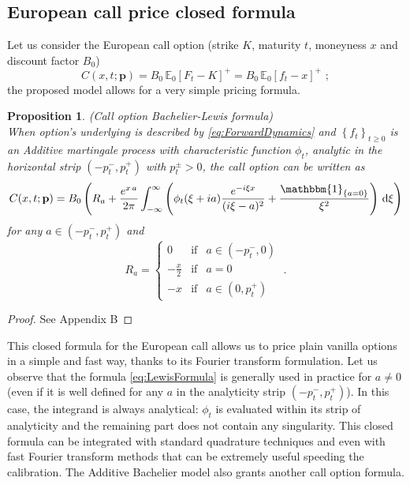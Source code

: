 \documentclass[12pt]{article}
\newtheorem{proposition}[theorem]{Proposition}
\theoremstyle{definition}
\theoremstyle{remark}
\numberwithin{theorem}{section}
\numberwithin{proposition}{section}
\numberwithin{lemma}{section}
\numberwithin{corollary}{section}
\numberwithin{definition}{section}
\numberwithin{remark}{section}
\numberwithin{example}{section}
\newcommand{\E}{\mathbb{E}}
\newcommand{\be}{\begin{equation}}
\newcommand{\en}{\end{equation}}
\begin{document}
\subsection{European call price closed formula}

Let us consider the European call option (strike $K$, maturity $t$, moneyness $x$ and discount factor $B_0$)
\begin{equation}
\label{eq:EU_generic}
C(x, t; \mathbf{p}) =B_0\,\E_0[F_t-K]^+=B_0\,\E_0[f_t-x]^+\,\,;
\end{equation}
the proposed model allows for a very simple pricing formula.
\begin{proposition} {\rm (Call option Bachelier-Lewis formula)} 
\label{prop:Lewis}\\ 
When option's underlying is described by \eqref{eq:ForwardDynamics} and $ \left\{f_t \right\}_{t\geq 0}$ is an Additive martingale process with 
characteristic function $\phi_t$, analytic in the horizontal strip $(-p_t^-,p_t^+)$ with $p_t^\pm>0$, the call option can be written as
\be
\label{eq:LewisFormula}
C(x, t; \mathbf{p}) =B_0\left(R_a+\frac{e^{x\,a}}{2\pi}\int_{-\infty}^{\infty}\left(\phi_t(\xi+ia)\frac{e^{-i\xi x}}{(i\xi-a)^2}+\frac{\mathbbm{1}_{\{a=0\}}}{\xi^2}\right)\,\mathrm{d}\xi\right)
\en
for any $a\in(-p_t^-,p_t^+)$ and
\[
R_a=
\left\{
\begin{array}{cll}
    0							&\text{if} & a\in(-p_t^-,0)\\[3mm]
    \displaystyle -\frac{x}{2} 	&\text{if} & a=0\\[3mm]
    -x 						&\text{if} & a\in(0,p_t^+)
\end{array}
\right.\;.
\]
\end{proposition}
\begin{proof}
    See Appendix B
\end{proof}

This closed formula for the European call allows us to price plain vanilla options in a simple and fast way, thanks to its Fourier transform formulation. Let us observe that the formula \eqref{eq:LewisFormula} is generally used in practice for $a \neq 0$ (even if it is well defined for any $a$ in the analyticity strip $(-p_t^-,p_t^+)$). In this case, the integrand is always analytical: $\phi_t$ is evaluated within its strip of analyticity and the remaining part does not contain any singularity. This closed formula can be integrated with standard quadrature techniques and even with fast Fourier transform methods \citep[see, e.g.,][]{teukolsky1992numerical} that can be extremely useful speeding the calibration. 
The Additive Bachelier model also grants 
another call option formula.
\end{document}
